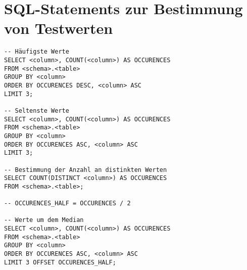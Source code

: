 \clearpage
\section{SQL-Statements zur Bestimmung von Testwerten}

\begin{lstlisting}[caption={Bestimmung vorzuschlagender Testwerte anhand von Datencharakteristiken}, label={lst:distinctvalues}, language=mySQL, deletekeywords={schema, table, TABLE, SCHEMA, COLUMN, column}]
-- Häufigste Werte
SELECT <column>, COUNT(<column>) AS OCCURENCES
FROM <schema>.<table>
GROUP BY <column>
ORDER BY OCCURENCES DESC, <column> ASC
LIMIT 3;

-- Seltenste Werte
SELECT <column>, COUNT(<column>) AS OCCURENCES
FROM <schema>.<table>
GROUP BY <column>
ORDER BY OCCURENCES ASC, <column> ASC
LIMIT 3;

-- Bestimmung der Anzahl an distinkten Werten
SELECT COUNT(DISTINCT <column>) AS OCCURENCES
FROM <schema>.<table>;

-- OCCURENCES_HALF = OCCURENCES / 2

-- Werte um dem Median
SELECT <column>, COUNT(<column>) AS OCCURENCES
FROM <schema>.<table>
GROUP BY <column>
ORDER BY OCCURENCES ASC, <column> ASC
LIMIT 3 OFFSET OCCURENCES_HALF;
\end{lstlisting}
